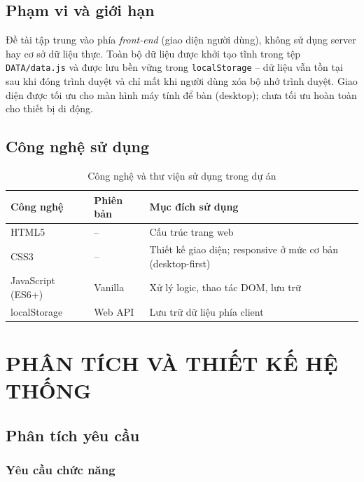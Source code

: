 \documentclass[12pt,a4paper]{article}
\begin{document}
\subsection{Phạm vi và giới hạn}

Đề tài tập trung vào phía \textit{front-end} (giao diện người dùng), không sử dụng server hay cơ sở dữ liệu thực. Toàn bộ dữ liệu được khởi tạo tĩnh trong tệp \texttt{DATA/data.js} và được lưu bền vững trong \texttt{localStorage} -- dữ liệu vẫn tồn tại sau khi đóng trình duyệt và chỉ mất khi người dùng xóa bộ nhớ trình duyệt. Giao diện được tối ưu cho màn hình máy tính để bàn (desktop); chưa tối ưu hoàn toàn cho thiết bị di động.

\subsection{Công nghệ sử dụng}

\begin{table}[H]
\centering
\caption{Công nghệ và thư viện sử dụng trong dự án}
\begin{tabularx}{\textwidth}{|l|l|X|}
\hline
\textbf{Công nghệ} & \textbf{Phiên bản} & \textbf{Mục đích sử dụng} \\
\hline
HTML5     & --      & Cấu trúc trang web \\
\hline
CSS3      & --      & Thiết kế giao diện; responsive ở mức cơ bản (desktop-first) \\
\hline
JavaScript (ES6+) & Vanilla & Xử lý logic, thao tác DOM, lưu trữ \\
\hline
localStorage & Web API & Lưu trữ dữ liệu phía client \\
\hline
\end{tabularx}
\end{table}

\section{PHÂN TÍCH VÀ THIẾT KẾ HỆ THỐNG}

\subsection{Phân tích yêu cầu}

\subsubsection{Yêu cầu chức năng}
\end{document}
